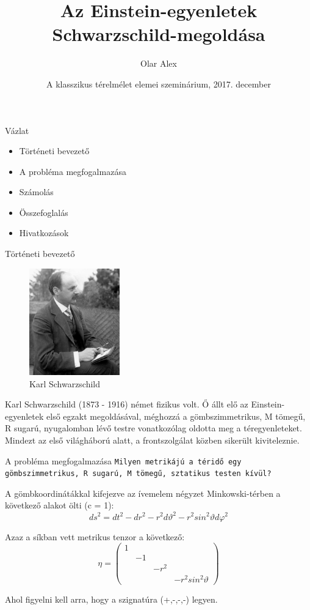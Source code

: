 \documentclass[10pt]{beamer}
\author{Olar Alex}
\title{Az Einstein-egyenletek Schwarzschild-megoldása}
\institute{Eötvös Loránd Tudományegyetem \\ \scriptsize{Fizika BSc III.}}
\date{A klasszikus térelmélet elemei szeminárium, 2017. december}
\begin{document}
\begin{frame}[t,plain]
\titlepage
\end{frame}

\begin{frame}[t]{Vázlat}
\begin{itemize}
\item Történeti bevezető
\item A probléma megfogalmazása
\item Számolás
\item Összefoglalás
\item Hivatkozások
\end{itemize}
\end{frame}

\begin{frame}[t]{Történeti bevezető}
\begin{figure}
\caption{Karl Schwarzschild}
\begin{center}
	\includegraphics[width=0.35\textwidth]{karl.jpg}
\end{center}
\end{figure}
\par Karl Schwarzschild (1873 - 1916) német fizikus volt. Ő állt elő az Einstein-egyenletek első egzakt megoldásával, méghozzá a
gömbszimmetrikus, M tömegű, R sugarú, nyugalomban lévő testre vonatkozólag oldotta meg a téregyenleteket. Mindezt az első
világháború alatt, a frontszolgálat közben sikerült kiviteleznie.
\end{frame}

\begin{frame}[t]{A probléma megfogalmazása}
\texttt{Milyen metrikájú a téridő egy gömbszimmetrikus, R sugarú, M tömegű, sztatikus testen kívül? }
\vspace{3mm}
\par A gömbkoordinátákkal kifejezve az ívemelem négyzet Minkowski-térben a következő alakot ölti (c = 1):
\begin{equation*}
ds^{2} = dt^{2} - dr^{2} -r^{2}d\vartheta^{2} - r^{2}sin^{2}\vartheta d\varphi^{2}
\end{equation*}
\par Azaz a síkban vett metrikus tenzor a következő:
$$
\eta = \begin{pmatrix}
1& & &  \\
& -1& &  \\
& & -r^{2}&  \\
& & & -r^{2}sin^{2}\vartheta
\end{pmatrix}
$$
\par Ahol figyelni kell arra, hogy a szignatúra (+,-,-,-) legyen.
\end{frame}
\end{document}
